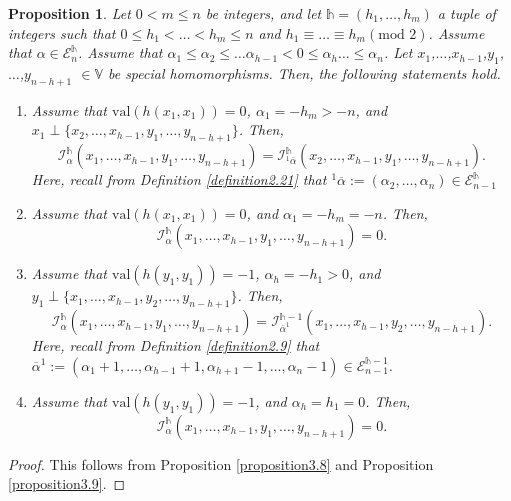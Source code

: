 \documentclass[11pt,oneside]{amsart}
\newcommand{\val}{{\mathrm{val}}}
\theoremstyle{plain}
\newtheorem{proposition}[theorem]{Proposition}
\theoremstyle{definition}
\theoremstyle{remark}
\newcommand{\tx}[1]{\text{#1}}
\newcommand{\BV}{{\mathbb V}}
\newcommand{\CE}{{\mathcal E}}
\newcommand{\CI}{{\mathcal I}}
\numberwithin{equation}{section}
\begin{document}
	\begin{proposition}\label{proposition3.11}
		Let $0 < m \leq n$ be integers, and let $\mathds{h}=(h_1,\dots,h_m)$ a tuple of integers such that $0\leq h_1<\dots<h_m \leq n$ and $h_1 \equiv \dots \equiv h_m (\tx{mod } 2)$. Assume that $\alpha \in \CE_n^{\mathds{h}}$. Assume that $\alpha_1 \leq \alpha_2\leq \dots \alpha_{h-1} < 0 \leq \alpha_h \dots \leq \alpha_n$. Let $x_1$,$\dots$,$x_{h-1}$,$y_1$,$\dots$,$y_{n-h+1}$ $\in \BV$ be special homomorphisms. Then, the following statements hold.
		\begin{enumerate}
			\item Assume that $\val (h(x_1,x_1))=0$, $\alpha_1=-h_m >-n$, and $x_1 \perp \lbrace x_2,\dots,x_{h-1},y_{1},\dots,y_{n-h+1}\rbrace$. Then,
			\begin{equation*}
				\CI_{\alpha}^{\mathds{h}}(x_1,\dots,x_{h-1},y_1,\dots,y_{n-h+1})=\CI_{\tx{}^1\overline{\alpha}}^{\mathds{h}}(x_2,\dots,x_{h-1},y_1,\dots,y_{n-h+1}).
			\end{equation*}
			Here, recall from Definition \ref{definition2.21} that $^1\overline{\alpha}:=(\alpha_2,\dots,\alpha_n) \in \CE_{n-1}^{\mathds{h}}$ 
			
			
			\item Assume that $\val (h(x_1,x_1))=0$, and $\alpha_{1}=-h_m=-n$. Then,
			\begin{equation*}
				\CI_{\alpha}^{\mathds{h}}(x_1,\dots,x_{h-1},y_1,\dots,y_{n-h+1})=0.
			\end{equation*}
			
			\item Assume that $\val (h(y_1,y_1))=-1$, $\alpha_h=-h_1 >0$, and $y_1 \perp \lbrace x_1,\dots,x_{h-1},y_{2},\dots,y_{n-h+1}\rbrace$. Then,
			\begin{equation*}
				\CI_{\alpha}^{\mathds{h}}(x_1,\dots,x_{h-1},y_1,\dots,y_{n-h+1})=\CI_{\overline{\alpha}^1}^{\mathds{h}-1}(x_1,\dots,x_{h-1},y_2,\dots,y_{n-h+1}).
			\end{equation*}
			Here, recall from Definition \ref{definition2.9} that $\overline{\alpha}^{1}:=(\alpha_1+1,\dots,\alpha_{h-1}+1,\alpha_{h+1}-1,\dots,\alpha_n-1) \in \CE_{n-1}^{\mathds{h}-1}.$ 
			
			
			\item Assume that $\val (h(y_1,y_1))=-1$, and $\alpha_{h}=h_1=0$. Then,
			\begin{equation*}
				\CI_{\alpha}^{\mathds{h}}(x_1,\dots,x_{h-1},y_1,\dots,y_{n-h+1})=0.
			\end{equation*}
		\end{enumerate}
	\end{proposition}
	\begin{proof}
		This follows from Proposition \ref{proposition3.8} and Proposition \ref{proposition3.9}.
	\end{proof}
	
\end{document}
